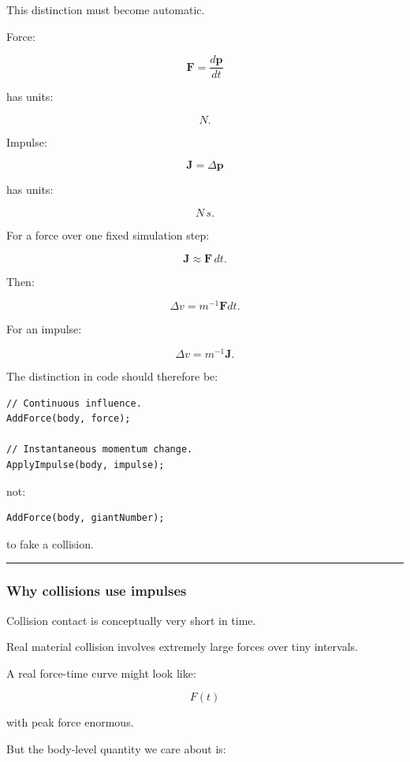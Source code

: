 This distinction must become automatic.

Force:

\[
\boxed{
\mathbf F
=
\frac{d\mathbf p}{dt}
}
\]

has units:

\[
N.
\]

Impulse:

\[
\boxed{
\mathbf J
=
\Delta\mathbf p
}
\]

has units:

\[
N\,s.
\]

For a force over one fixed simulation step:

\[
\mathbf J
\approx
\mathbf F\,dt.
\]

Then:

\[
\Delta v
=
m^{-1}\mathbf Fdt.
\]

For an impulse:

\[
\Delta v
=
m^{-1}\mathbf J.
\]

The distinction in code should therefore be:

\begin{verbatim}
// Continuous influence.
AddForce(body, force);

// Instantaneous momentum change.
ApplyImpulse(body, impulse);
\end{verbatim}

not:

\begin{verbatim}
AddForce(body, giantNumber);
\end{verbatim}

to fake a collision.

\begin{center}\rule{0.5\linewidth}{0.5pt}\end{center}

\subsubsection{Why collisions use impulses}\label{why-collisions-use-impulses}

Collision contact is conceptually very short in time.

Real material collision involves extremely large forces over tiny intervals.

A real force-time curve might look like:

\[
F(t)
\]

with peak force enormous.

But the body-level quantity we care about is:

